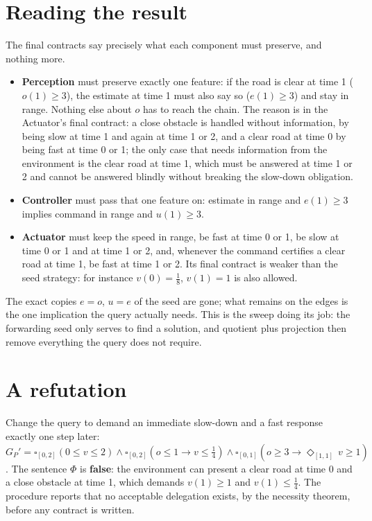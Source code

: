 \documentclass[10pt]{article}\usepackage[margin=0.75in]{geometry}\usepackage{amsmath,amssymb,booktabs}
\begin{document}
\section{Reading the result}
The final contracts say precisely what each component must preserve, and nothing more.
\begin{itemize}
\item \textbf{Perception} must preserve exactly one feature: if the road is clear at time 1 ($o(1)\ge3$), the estimate at time 1 must also say so ($e(1)\ge3$) and stay in range. Nothing else about $o$ has to reach the chain. The reason is in the Actuator's final contract: a close obstacle is handled without information, by being slow at time 1 and again at time 1 or 2, and a clear road at time 0 by being fast at time 0 or 1; the only case that needs information from the environment is the clear road at time 1, which must be answered at time 1 or 2 and cannot be answered blindly without breaking the slow-down obligation.
\item \textbf{Controller} must pass that one feature on: estimate in range and $e(1)\ge3$ implies command in range and $u(1)\ge3$.
\item \textbf{Actuator} must keep the speed in range, be fast at time 0 or 1, be slow at time 0 or 1 and at time 1 or 2, and, whenever the command certifies a clear road at time 1, be fast at time 1 or 2. Its final contract is weaker than the seed strategy: for instance $v(0)=\tfrac18$, $v(1)=1$ is also allowed.
\end{itemize}
The exact copies $e=o$, $u=e$ of the seed are gone; what remains on the edges is the one implication the query actually needs. This is the sweep doing its job: the forwarding seed only serves to find a solution, and quotient plus projection then remove everything the query does not require.

\section{A refutation}
Change the query to demand an immediate slow-down and a fast response exactly one step later:
$G_P'=\square_{[0,2]}(0\le v\le2)\wedge\square_{[0,2]}(o\le1\to v\le\tfrac14)\wedge\square_{[0,1]}(o\ge3\to\Diamond_{[1,1]}\,v\ge1)$. The sentence $\Phi$ is \textbf{false}: the environment can present a clear road at time 0 and a close obstacle at time 1, which demands $v(1)\ge1$ and $v(1)\le\tfrac14$. The procedure reports that no acceptable delegation exists, by the necessity theorem, before any contract is written.
\end{document}
